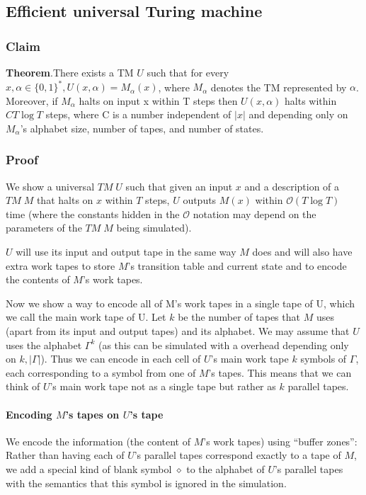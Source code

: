 \documentclass[a4paper]{article}
\begin{document}
\subsection{Efficient universal Turing machine}
\subsubsection{Claim}
\textbf{Theorem}.There exists a TM $U$ such that for every $x, \alpha \in \{0, 1\}^{*} , U(x, \alpha) = M_\alpha(x)$, where $M_\alpha$
denotes the TM represented by $\alpha$.
Moreover, if $M_\alpha$ halts on input x within T steps then $U(x, \alpha)$ halts within $CT \log{T}$ steps,
where C is a number independent of $|x|$ and depending only on $M_\alpha$'s alphabet size,
number of tapes, and number of states.

\subsubsection{Proof}
We show a universal $TM \; U$
such that given an input $x$ and a description of a $TM \; M$ that halts on $x$ within $T$ steps,
$U$ outputs $M(x)$ within $\mathcal{O}(T\log T)$ time (where the constants hidden in the $\mathcal{O}$ notation
may depend on the parameters of the $TM \; M$ being simulated).

$U$ will use its input and output
tape in the same way $M$ does and will also have extra work tapes to store $M$’s transition
table and current state and to encode the contents of $M$’s work tapes.

Now we show a way to encode all of M’s work tapes in a single tape of U, which
we call the main work tape of U. 
Let $k$ be the number of tapes that $M$ uses (apart from its input and output tapes)
and  its alphabet. We may assume that $U$ uses the
alphabet $\Gamma^{k}$ (as this can be simulated with a overhead depending only on $k, |\Gamma|$). Thus
we can encode in each cell of $U$’s main work tape $k$ symbols of $\Gamma$, each corresponding
to a symbol from one of $M$'s tapes. This means that we can think of $U$’s main work tape
not as a single tape but rather as $k$ parallel tapes. 

\paragraph{Encoding \texorpdfstring{$M$}{}’s tapes on \texorpdfstring{$U$}{}’s tape}

	We encode the information (the content of $M$'s work tapes) using “buffer zones”: Rather
than having each of $U$’s parallel tapes correspond exactly to a tape of $M$, we add a
special kind of blank symbol $\diamond$ to the alphabet of $U$’s parallel tapes with the semantics
that this symbol is ignored in the simulation.
\end{document}
